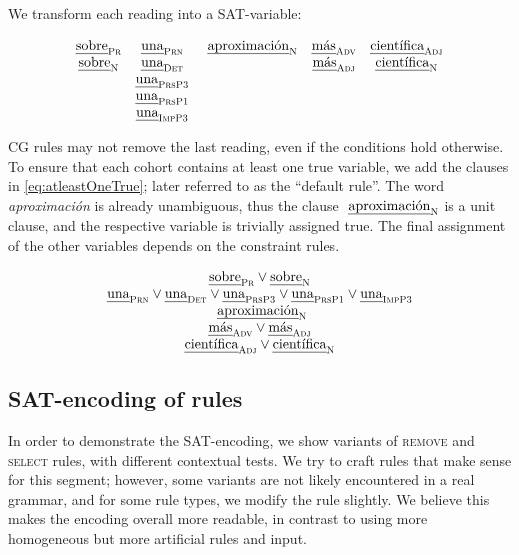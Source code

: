 \newpage
\noindent We transform each reading into a SAT-variable:

\begin{equation}
\begin{array}{c c c c c}
\sobrePr & \unaPrn & \aproximacionN & \masAdv & \cientificaAdj \\
\sobreN  & \unaDet &                & \masAdj & \cientificaN \\
         & \unaPrsPThree \\
         & \unaPrsPOne \\
         & \unaImp \\
\end{array}
\end{equation}

CG rules may not remove the last reading, even if the conditions hold otherwise.
To ensure that each cohort contains at least one true variable, we add the clauses in \ref{eq:atleastOneTrue}; later referred to as the ``default rule''.
The word \emph{aproximación} is already unambiguous, thus the clause $\text{ \em aproximaci\'{o}n}_{\text{\sc N}}$ is a unit clause, and the respective variable is trivially assigned true.
The final assignment of the other variables depends on the constraint rules.


\begin{equation}
\begin{array}{c}
\sobrePr \vee \sobreN \\
\unaPrn \vee \unaDet \vee \unaPrsPThree \vee \unaPrsPOne \vee \unaImp \\
\aproximacionN \\
\masAdv \vee \masAdj \\
\cientificaAdj \vee \cientificaN \\
\end{array}
\label{eq:atleastOneTrue}
\end{equation}


\subsection{SAT-encoding of rules}
\label{appendix1}

In order to demonstrate the SAT-encoding, we show variants of \textsc{remove} and \textsc{select} rules, with different contextual tests.
We try to craft rules that make sense for this segment; however, some variants are not likely encountered in a real grammar, and for some rule types, we modify the rule slightly. We believe this makes the encoding overall more readable, in contrast to using more homogeneous but more artificial rules and input.

